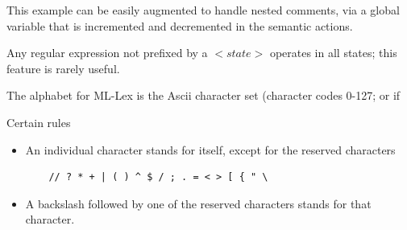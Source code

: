 \documentclass[8pt, a4paper, oneside, twocolumn]{extarticle}
\begin{document}
This example can be easily augmented to handle nested comments, via a 
global variable that is incremented and decremented in the semantic actions. 

Any regular expression not prefixed by a $<state>$ operates in all states; this  
feature is rarely useful. 

The alphabet for ML-Lex is the Ascii character set (character codes 0-127; or if %

Certain rules
\begin{itemize}
    \item     An individual character stands for itself, except for the reserved characters 
    \begin{verbatim}
    // ? * + | ( ) ^ $ / ; . = < > [ { " \

    \end{verbatim}

    \item A backslash followed by one of the reserved characters stands for that character. 


\end{itemize}
\end{document}
